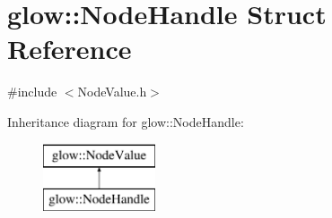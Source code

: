 \hypertarget{structglow_1_1_node_handle}{}\section{glow\+:\+:Node\+Handle Struct Reference}
\label{structglow_1_1_node_handle}


{\ttfamily \#include $<$Node\+Value.\+h$>$}

Inheritance diagram for glow\+:\+:Node\+Handle\+:\begin{figure}[H]
\begin{center}
\leavevmode
\includegraphics[height=2.000000cm]{structglow_1_1_node_handle}
\end{center}
\end{figure}
